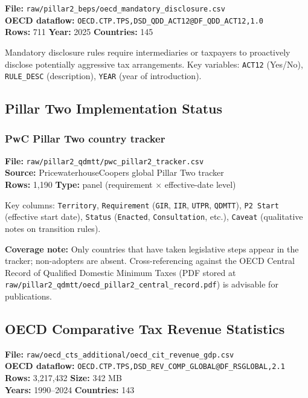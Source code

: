 \documentclass[11pt,a4paper]{article}
\newcommand{\code}[1]{\texttt{#1}}
\begin{document}
\textbf{File:} \texttt{raw/pillar2\_beps/oecd\_mandatory\_disclosure.csv}\\
\textbf{OECD dataflow:} \texttt{OECD.CTP.TPS,DSD\_QDD\_ACT12@DF\_QDD\_ACT12,1.0}\\
\textbf{Rows:} 711 \quad \textbf{Year:} 2025 \quad \textbf{Countries:} 145

Mandatory disclosure rules require intermediaries or taxpayers to proactively disclose potentially aggressive tax arrangements.  Key variables: \code{ACT12} (Yes/No), \code{RULE\_DESC} (description), \code{YEAR} (year of introduction).

\subsection{Pillar Two Implementation Status}\label{sec:pillar2}


\subsubsection{PwC Pillar Two country tracker}

\textbf{File:} \texttt{raw/pillar2\_qdmtt/pwc\_pillar2\_tracker.csv}\\
\textbf{Source:} PricewaterhouseCoopers global Pillar Two tracker\\
\textbf{Rows:} 1{,}190 \quad \textbf{Type:} panel (requirement $\times$ effective-date level)

Key columns: \texttt{Territory}, \texttt{Requirement} (\texttt{GIR}, \texttt{IIR}, \texttt{UTPR}, \texttt{QDMTT}), \texttt{P2 Start} (effective start date), \texttt{Status} (\texttt{Enacted}, \texttt{Consultation}, etc.), \texttt{Caveat} (qualitative notes on transition rules).

\noindent\textbf{Coverage note:} Only countries that have taken legislative steps appear in the tracker; non-adopters are absent.  Cross-referencing against the OECD Central Record of Qualified Domestic Minimum Taxes (PDF stored at \texttt{raw/pillar2\_qdmtt/oecd\_pillar2\_central\_record.pdf}) is advisable for publications.

\subsection{OECD Comparative Tax Revenue Statistics}\label{sec:cts}

\textbf{File:} \texttt{raw/oecd\_cts\_additional/oecd\_cit\_revenue\_gdp.csv}\\
\textbf{OECD dataflow:} \texttt{OECD.CTP.TPS,DSD\_REV\_COMP\_GLOBAL@DF\_RSGLOBAL,2.1}\\
\textbf{Rows:} 3{,}217{,}432 \quad \textbf{Size:} 342 MB\\
\textbf{Years:} 1990--2024 \quad \textbf{Countries:} 143
\end{document}
